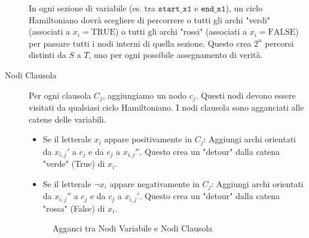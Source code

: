 \documentclass[a4paper]{article}
\theoremstyle{definition} %
\begin{document}
\begin{description}
    In ogni sezione di variabile (es. tra $\texttt{start\_x1}$ e $\texttt{end\_x1}$), un ciclo Hamiltoniano dovrà scegliere di percorrere o tutti gli archi "verdi" (associati a $x_i = \text{TRUE}$) o tutti gli archi "rossi" (associati a $x_i = \text{FALSE}$) per passare tutti i nodi interni di quella sezione. Questo crea $2^n$ percorsi distinti da $S$ a $T$, uno per ogni possibile assegnamento di verità.

    \item[Nodi Clausola] Per ogni clausola $C_j$, aggiungiamo un nodo $c_j$. Questi nodi devono essere visitati da qualsiasi ciclo Hamiltoniano. I nodi clausola sono agganciati alle catene delle variabili.
    \begin{itemize}
        \item Se il letterale $x_i$ appare positivamente in $C_j$: Aggiungi archi orientati da $x_{i,j}'$ a $c_j$ e da $c_j$ a $x_{i,j}''$. Questo crea un "detour" dalla catena "verde" (True) di $x_i$.
        \item Se il letterale $\neg x_i$ appare negativamente in $C_j$: Aggiungi archi orientati da $x_{i,j}''$ a $c_j$ e da $c_j$ a $x_{i,j}'$. Questo crea un "detour" dalla catena "rossa" (False) di $x_i$.
    \end{itemize}

    \begin{figure}[h]
    \centering
    \caption{Agganci tra Nodi Variabile e Nodi Clausola}
    \label{fig:clause_attachment}
    \end{figure}
\end{description}
\end{document}
